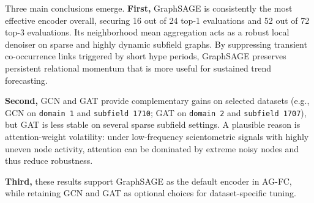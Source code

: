 \documentclass[runningheads]{llncs}
\begin{document}
Three main conclusions emerge. \textbf{First,} GraphSAGE is consistently the most effective encoder overall, securing 16 out of 24 top-1 evaluations and 52 out of 72 top-3 evaluations. Its neighborhood mean aggregation acts as a robust local denoiser on sparse and highly dynamic subfield graphs. By suppressing transient co-occurrence links triggered by short hype periods, GraphSAGE preserves persistent relational momentum that is more useful for sustained trend forecasting.

\textbf{Second,} GCN and GAT provide complementary gains on selected datasets (e.g., GCN on \texttt{domain 1} and \texttt{subfield 1710}; GAT on \texttt{domain 2} and \texttt{subfield 1707}), but GAT is less stable on several sparse subfield settings. A plausible reason is attention-weight volatility: under low-frequency scientometric signals with highly uneven node activity, attention can be dominated by extreme noisy nodes and thus reduce robustness.

\textbf{Third,} these results support GraphSAGE as the default encoder in AG-FC, while retaining GCN and GAT as optional choices for dataset-specific tuning.
\end{document}
